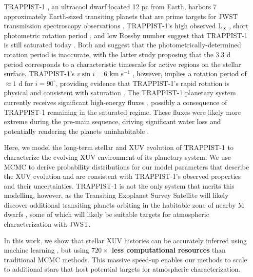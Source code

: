 \documentclass[twocolumn]{aastex62}
\def\lsim{~\rlap{$<$}{\lower 1.0ex\hbox{$\sim$}}}
\newcommand{\xxx}[1]{{\textbf{#1}}}
\newcommand{\approxposterior}[0]{\texttt{approxposterior}\xspace}
\begin{document}
TRAPPIST-1 \citep{Gillon2016,Gillon2017}, an ultracool dwarf located 12 pc from Earth, harbors 7 approximately Earth-sized transiting planets that are prime targets for JWST transmission spectroscopy observations \citep{Morley2017,Lincowski2018,Lustig2019}. TRAPPIST-1's high observed L$_{X}$ \citep{Wheatley2017}, short photometric rotation period \citep[3.3 d, ][]{Luger2017}, and low Rossby number \citep[Ro $\approx 0.01$, ][]{Roettenbacher2017} suggest that TRAPPIST-1 is still saturated today \citep{Pizzolato2003,Wright2011,Wright2018}. Both \citet{Roettenbacher2017} and \citet{Morris2018} suggest that the photometrically-determined rotation period is inaccurate, with the latter study proposing that the 3.3 d period corresponds to a characteristic timescale for active regions on the stellar surface. TRAPPIST-1's $v \sin i = 6$ km s$^{-1}$ \citep{Barnes2014}, however, implies a rotation period of $\approx 1$ d for $i = 90^{\circ}$, providing evidence that TRAPPIST-1's rapid rotation is physical and consistent with saturation \citep[$P_{rot} \lsim 20$ d,][]{Wright2018}. The TRAPPIST-1 planetary system currently receives significant high-energy fluxes \citep{Bourrier2017b,Wheatley2017,Peacock2019}, possibly a consequence of TRAPPIST-1 remaining in the saturated regime. These fluxes were likely more extreme during the pre-main sequence, driving significant water loss and potentially rendering the planets uninhabitable \citep{Bolmont2017,Bourrier2017a}. 

Here, we model the long-term stellar and XUV evolution of TRAPPIST-1 to characterize the evolving XUV environment of its planetary system. We use MCMC to derive probability distributions for our model parameters that describe the XUV evolution and are consistent with TRAPPIST-1's observed properties and their uncertainties. TRAPPIST-1 is not the only system that merits this modelling, however, as the Transiting Exoplanet Survey Satellite will likely discover additional transiting planets orbiting in the habitable zone of nearby M dwarfs \citep{Barclay2018}, some of which will likely be suitable targets for atmospheric characterization with JWST. 

In this work, we show that stellar XUV histories can be accurately inferred using machine learning \citep[\approxposterior, ][]{FlemingVanderPlas2018}, but using \xxx{$720\times$ less computational resources} than traditional MCMC methods. This massive speed-up enables our methods to scale to additional stars that host potential targets for atmospheric characterization. 
\end{document}
